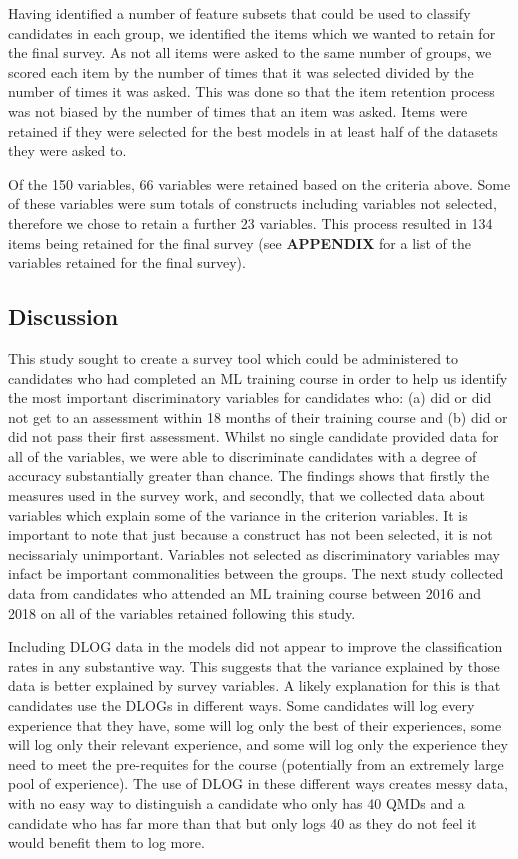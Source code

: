\documentclass[a4paper,]{book}
\begin{document}
Having identified a number of feature subsets that could be used to classify candidates in each group, we identified the items which we wanted to retain for the final survey. As not all items were asked to the same number of groups, we scored each item by the number of times that it was selected divided by the number of times it was asked. This was done so that the item retention process was not biased by the number of times that an item was asked. Items were retained if they were selected for the best models in at least half of the datasets they were asked to.

Of the 150 variables, 66 variables were retained based on the criteria above. Some of these variables were sum totals of constructs including variables not selected, therefore we chose to retain a further 23 variables. This process resulted in 134 items being retained for the final survey (see \textbf{APPENDIX} for a list of the variables retained for the final survey).

\hypertarget{discussion-4}{%
\subsection{Discussion}\label{discussion-4}}

This study sought to create a survey tool which could be administered to candidates who had completed an ML training course in order to help us identify the most important discriminatory variables for candidates who: (a) did or did not get to an assessment within 18 months of their training course and (b) did or did not pass their first assessment. Whilst no single candidate provided data for all of the variables, we were able to discriminate candidates with a degree of accuracy substantially greater than chance. The findings shows that firstly the measures used in the survey work, and secondly, that we collected data about variables which explain some of the variance in the criterion variables. It is important to note that just because a construct has not been selected, it is not necissarialy unimportant. Variables not selected as discriminatory variables may infact be important commonalities between the groups. The next study collected data from candidates who attended an ML training course between 2016 and 2018 on all of the variables retained following this study.

Including DLOG data in the models did not appear to improve the classification rates in any substantive way. This suggests that the variance explained by those data is better explained by survey variables. A likely explanation for this is that candidates use the DLOGs in different ways. Some candidates will log every experience that they have, some will log only the best of their experiences, some will log only their relevant experience, and some will log only the experience they need to meet the pre-requites for the course (potentially from an extremely large pool of experience). The use of DLOG in these different ways creates messy data, with no easy way to distinguish a candidate who only has 40 QMDs and a candidate who has far more than that but only logs 40 as they do not feel it would benefit them to log more.
\end{document}
